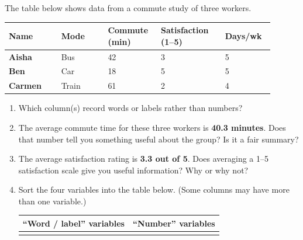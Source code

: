 \documentclass[10pt]{article}
\begin{document}
\namedateperiod

\vspace{0.18in}

\noindent The table below shows data from a commute study of three workers.

\vspace{0.1in}

\renewcommand{\arraystretch}{1.6}
\begin{tabularx}{\linewidth}{@{} >{\bfseries}p{0.18\linewidth}
                                    C{0.16\linewidth} C{0.18\linewidth}
                                    C{0.22\linewidth} C{0.16\linewidth} @{}}
\textbf{Name} & \textbf{Mode} & \textbf{Commute (min)} &
\textbf{Satisfaction (1--5)} & \textbf{Days/wk} \\
\midrule
Aisha   & Bus    & 42 & 3 & 5 \\
Ben     & Car    & 18 & 5 & 5 \\
Carmen  & Train  & 61 & 2 & 4 \\
\end{tabularx}

\vspace{0.18in}

\begin{enumerate}

  \item Which column(s) record words or labels rather than numbers?\\[8pt]
        \writeline

  \item The average commute time for these three workers is \textbf{40.3 minutes}.
        Does that number tell you something useful about the group?
        Is it a fair summary?\\[8pt]
        \writeline

  \item The average satisfaction rating is \textbf{3.3 out of 5}.
        Does averaging a 1--5 satisfaction scale give you useful information?
        Why or why not?\\[8pt]
        \writeline

  \item Sort the four variables into the table below.
        (Some columns may have more than one variable.)

\vspace{0.08in}
\renewcommand{\arraystretch}{2.0}
\begin{tabularx}{\linewidth}{@{} |>{\centering\arraybackslash}X
                                    |>{\centering\arraybackslash}X| @{}}
\hline
\rowcolor{sky}
\textbf{``Word / label'' variables} & \textbf{``Number'' variables} \\
\hline
& \\
\hline
\end{tabularx}

\end{enumerate}
\end{document}
